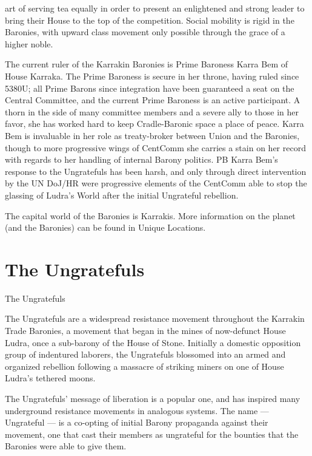                                                                                                                     


art of serving tea equally in order to present an enlightened and strong leader to bring their  
House to the top of the competition. Social mobility is rigid in the Baronies, with upward class  
movement only possible through the grace of a higher noble. 
 

The current ruler of the Karrakin Baronies is Prime Baroness Karra Bem of House Karraka. The  
Prime Baroness is secure in her throne, having ruled since 5380U; all Prime Barons since  
integration have been guaranteed a seat on the Central Committee, and the current Prime  
Baroness is an active participant. A thorn in the side of many committee members and a severe  
ally to those in her favor, she has worked hard to keep Cradle-Baronic space a place of peace.  
Karra Bem is invaluable in her role as treaty-broker between Union and the Baronies, though to  
more progressive wings of CentComm she carries a stain on her record with regards to her  
handling of internal Barony politics. PB Karra Bem’s response to the Ungratefuls has been harsh,  
and only through direct intervention by the UN DoJ/HR were progressive elements of the  
CentComm able to stop the glassing of Ludra’s World after the initial Ungrateful rebellion. 
 

The capital world of the Baronies is Karrakis. More information on the planet (and the Baronies)  
can be found in Unique Locations. 
 
\section{The Ungratefuls}
The Ungratefuls   

The Ungratefuls are a widespread resistance movement throughout the Karrakin Trade Baronies,  
a movement that began in the mines of now-defunct House Ludra, once a sub-barony of the  
House of Stone. Initially a domestic opposition group of indentured laborers, the Ungratefuls  
blossomed into an armed and organized rebellion following a massacre of striking miners on one  
of House Ludra’s tethered moons. 
 

The Ungratefuls’ message of liberation is a popular one, and has inspired many underground  
resistance movements in analogous systems. The name — Ungrateful — is a co-opting of initial  
Barony propaganda against their movement, one that cast their members as ungrateful for the  
bounties that the Baronies were able to give them. 
 

